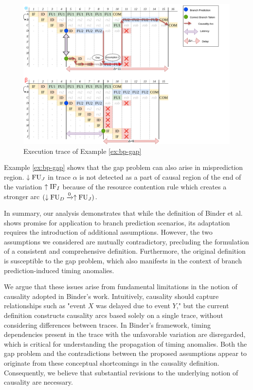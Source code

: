 \begin{figure}
    \centering
    \includegraphics[width=\textwidth]{figures/bp-gap.png}
    \caption{Execution trace of Example \ref{ex:bp-gap}}
    \label{fig:bp-gap-trace}
\end{figure}

Example \ref{ex:bp-gap} shows that the gap problem can also arise in misprediction region. $\downarrow\mathrm{FU}_J$ in trace $\alpha$ is not detected as a part of causal region of the end of the variation $\uparrow\mathrm{IF}_I$ because of the resource contention rule which creates a stronger arc $(\downarrow\mathrm{FU}_D \xrightarrow{0} \uparrow\mathrm{FU}_J)$.

In summary, our analysis demonstrates that while the definition of Binder et al. shows promise for application to branch prediction scenarios, its adaptation requires the introduction of additional assumptions. However, the two assumptions we considered are mutually contradictory, precluding the formulation of a consistent and comprehensive definition. Furthermore, the original definition is susceptible to the gap problem, which also manifests in the context of branch prediction-induced timing anomalies.

We argue that these issues arise from fundamental limitations in the notion of causality adopted in Binder's work. Intuitively, causality should capture relationships such as "event $X$ was delayed due to event $Y$," but the current definition constructs causality arcs based solely on a single trace, without considering differences between traces. In Binder's framework, timing dependencies present in the trace with the unfavorable variation are disregarded, which is critical for understanding the propagation of timing anomalies. Both the gap problem and the contradictions between the proposed assumptions appear to originate from these conceptual shortcomings in the causality definition. Consequently, we believe that substantial revisions to the underlying notion of causality are necessary.


